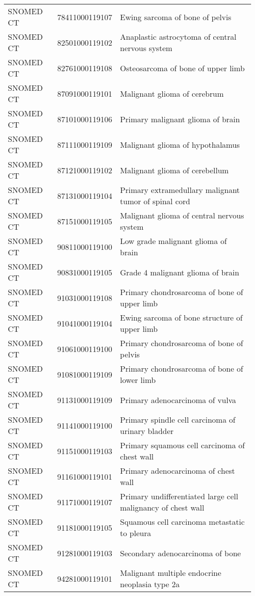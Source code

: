 \begin{longtable}{p{}p{}p{}}
  SNOMED CT & 78411000119107 & Ewing sarcoma of bone of pelvis \\ 
  SNOMED CT & 82501000119102 & Anaplastic astrocytoma of central nervous system \\ 
  SNOMED CT & 82761000119108 & Osteosarcoma of bone of upper limb \\ 
  SNOMED CT & 87091000119101 & Malignant glioma of cerebrum \\ 
  SNOMED CT & 87101000119106 & Primary malignant glioma of brain \\ 
  SNOMED CT & 87111000119109 & Malignant glioma of hypothalamus \\ 
  SNOMED CT & 87121000119102 & Malignant glioma of cerebellum \\ 
  SNOMED CT & 87131000119104 & Primary extramedullary malignant tumor of spinal cord \\ 
  SNOMED CT & 87151000119105 & Malignant glioma of central nervous system \\ 
  SNOMED CT & 90811000119100 & Low grade malignant glioma of brain \\ 
  SNOMED CT & 90831000119105 & Grade 4 malignant glioma of brain \\ 
  SNOMED CT & 91031000119108 & Primary chondrosarcoma of bone of upper limb \\ 
  SNOMED CT & 91041000119104 & Ewing sarcoma of bone structure of upper limb \\ 
  SNOMED CT & 91061000119100 & Primary chondrosarcoma of bone of pelvis \\ 
  SNOMED CT & 91081000119109 & Primary chondrosarcoma of bone of lower limb \\ 
  SNOMED CT & 91131000119109 & Primary adenocarcinoma of vulva \\ 
  SNOMED CT & 91141000119100 & Primary spindle cell carcinoma of urinary bladder \\ 
  SNOMED CT & 91151000119103 & Primary squamous cell carcinoma of chest wall \\ 
  SNOMED CT & 91161000119101 & Primary adenocarcinoma of chest wall \\ 
  SNOMED CT & 91171000119107 & Primary undifferentiated large cell malignancy of chest wall \\ 
  SNOMED CT & 91181000119105 & Squamous cell carcinoma metastatic to pleura \\ 
  SNOMED CT & 91281000119103 & Secondary adenocarcinoma of bone \\ 
  SNOMED CT & 94281000119101 & Malignant multiple endocrine neoplasia type 2a \\ 

\end{longtable}
